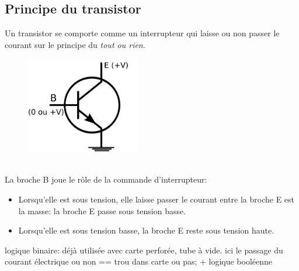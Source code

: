 \documentclass[a4paper,11pt]{article}
\begin{document}
\begin{Form}
\subsection{Principe du transistor}
Un transistor se comporte comme un interrupteur qui laisse ou non passer le courant sur le principe du \emph{tout ou rien}.
\begin{figure}[!h]
\centering
\includegraphics[width=5cm]{ressources/transistor-schema.png}
\label{transistor}
\end{figure}
\\La broche B joue le rôle de la commande d'interrupteur:
\begin{itemize}
\item Lorsqu'elle est sous tension, elle laisse passer le courant entre la broche E est la masse: la broche E passe sous tension basse.
\item Lorsqu'elle est sous tension basse, la broche E reste sous tension haute.
\end{itemize}
\begin{commentprof}
logique binaire: déjà utilisée avec carte perforée, tube à vide. ici le passage du courant électrique ou non == trou dans carte ou pas; + logique booléenne
\end{commentprof}

\end{Form}
\end{document}
